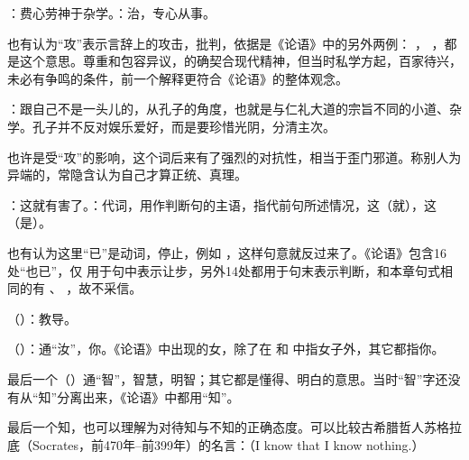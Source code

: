 {
\item {}：费心劳神于杂学。：治，专心从事。

也有认为“攻”表示言辞上的攻击，批判，依据是《论语》中的另外两例： ， ，都是这个意思。尊重和包容异议，的确契合现代精神，但当时私学方起，百家待兴，未必有争鸣的条件，前一个解释更符合《论语》的整体观念。

：跟自己不是一头儿的，从孔子的角度，也就是与仁礼大道的宗旨不同的小道、杂学。孔子并不反对娱乐爱好，而是要珍惜光阴，分清主次。

也许是受“攻”的影响，这个词后来有了强烈的对抗性，相当于歪门邪道。称别人为异端的，常隐含认为自己才算正统、真理。

\item {}：这就有害了。：代词，用作判断句的主语，指代前句所述情况，这（就），这（是）。

也有认为这里“已”是动词，停止，例如  ，这样句意就反过来了。《论语》包含16处“也已”，仅  用于句中表示让步，另外14处都用于句末表示判断，和本章句式相同的有  、 ，故不采信。
}
{}


{
\item {}（）：教导。
\item {}（）：通“汝”，你。《论语》中出现的女，除了在  和  中指女子外，其它都指你。
\item {}最后一个（）通“智”，智慧，明智；其它都是懂得、明白的意思。当时“智”字还没有从“知”分离出来，《论语》中都用“知”。

最后一个知，也可以理解为对待知与不知的正确态度。可以比较古希腊哲人苏格拉底（Socrates，前470年--前399年）的名言：（I know that I know nothing.）
}
{}  %


